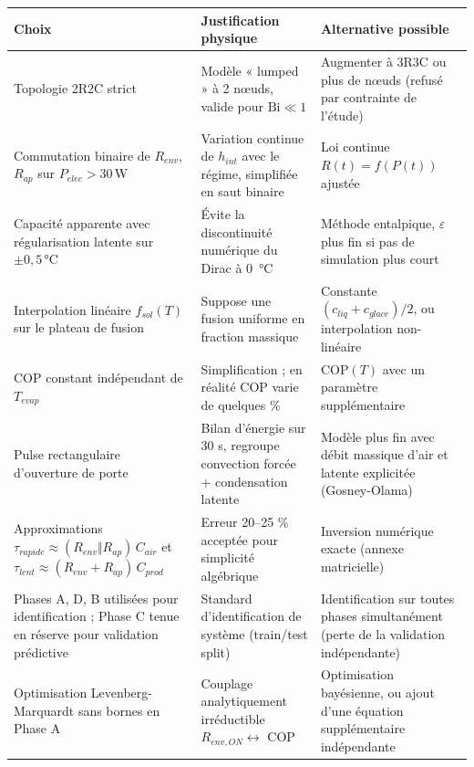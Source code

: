 \documentclass[11pt,a4paper]{article}
\begin{document}
\begin{center}
\renewcommand{\arraystretch}{1.4}
\begin{tabular}{p{4.5cm}p{4cm}p{6cm}}
\toprule
\textbf{Choix} & \textbf{Justification physique} & \textbf{Alternative possible} \\
\midrule
Topologie 2R2C strict & Modèle « lumped » à 2 nœuds, valide pour $\mathrm{Bi}\ll 1$ &
Augmenter à 3R3C ou plus de nœuds (refusé par contrainte de l'étude) \\
\midrule
Commutation binaire de $R_{env}$, $R_{ap}$ sur $P_{elec}>30\,$W & Variation continue de
$h_{int}$ avec le régime, simplifiée en saut binaire & Loi continue $R(t) = f(P(t))$
ajustée \\
\midrule
Capacité apparente avec régularisation latente sur $\pm 0{,}5\,\si{\celsius}$ & Évite la
discontinuité numérique du Dirac à \SI{0}{\celsius} & Méthode entalpique, $\varepsilon$
plus fin si pas de simulation plus court \\
\midrule
Interpolation linéaire $f_{sol}(T)$ sur le plateau de fusion & Suppose une fusion uniforme
en fraction massique & Constante $(c_{liq}+c_{glace})/2$, ou interpolation non-linéaire \\
\midrule
COP constant indépendant de $T_{evap}$ & Simplification ; en réalité COP varie de
quelques \% & COP$(T)$ avec un paramètre supplémentaire \\
\midrule
Pulse rectangulaire d'ouverture de porte & Bilan d'énergie sur 30 s, regroupe convection
forcée + condensation latente & Modèle plus fin avec débit massique d'air et latente
explicitée (Gosney-Olama) \\
\midrule
Approximations $\tau_{rapide} \approx (R_{env}\Vert R_{ap})\,C_{air}$ et
$\tau_{lent} \approx (R_{env}+R_{ap})\,C_{prod}$ & Erreur 20--25 \% acceptée pour
simplicité algébrique & Inversion numérique exacte (annexe matricielle) \\
\midrule
Phases A, D, B utilisées pour identification ; Phase C tenue en réserve pour validation
prédictive & Standard d'identification de système (train/test split) & Identification
sur toutes phases simultanément (perte de la validation indépendante) \\
\midrule
Optimisation Levenberg-Marquardt sans bornes en Phase A & Couplage analytiquement
irréductible $R_{env,ON}\leftrightarrow$ COP & Optimisation bayésienne, ou ajout d'une
équation supplémentaire indépendante \\
\bottomrule
\end{tabular}
\end{center}
\end{document}
